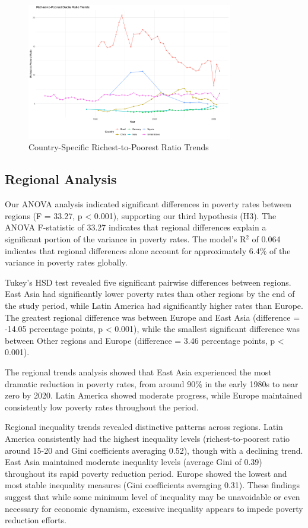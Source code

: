 \documentclass[12pt,a4paper]{article}
\begin{document}
\begin{figure}[h]
\centering
\includegraphics[width=0.8\textwidth]{../output/visualizations/country_rich_poor_trends.png}
\caption{Country-Specific Richest-to-Poorest Ratio Trends}
\end{figure}

\subsection{Regional Analysis}
Our ANOVA analysis indicated significant differences in poverty rates between regions (F = 33.27, p < 0.001), supporting our third hypothesis (H3). The ANOVA F-statistic of 33.27 indicates that regional differences explain a significant portion of the variance in poverty rates. The model's R$^2$ of 0.064 indicates that regional differences alone account for approximately 6.4\% of the variance in poverty rates globally.

Tukey's HSD test revealed five significant pairwise differences between regions. East Asia had significantly lower poverty rates than other regions by the end of the study period, while Latin America had significantly higher rates than Europe. The greatest regional difference was between Europe and East Asia (difference = -14.05 percentage points, p < 0.001), while the smallest significant difference was between Other regions and Europe (difference = 3.46 percentage points, p < 0.001).

The regional trends analysis showed that East Asia experienced the most dramatic reduction in poverty rates, from around 90\% in the early 1980s to near zero by 2020. Latin America showed moderate progress, while Europe maintained consistently low poverty rates throughout the period.

Regional inequality trends revealed distinctive patterns across regions. Latin America consistently had the highest inequality levels (richest-to-poorest ratio around 15-20 and Gini coefficients averaging 0.52), though with a declining trend. East Asia maintained moderate inequality levels (average Gini of 0.39) throughout its rapid poverty reduction period. Europe showed the lowest and most stable inequality measures (Gini coefficients averaging 0.31). These findings suggest that while some minimum level of inequality may be unavoidable or even necessary for economic dynamism, excessive inequality appears to impede poverty reduction efforts.
\end{document}
